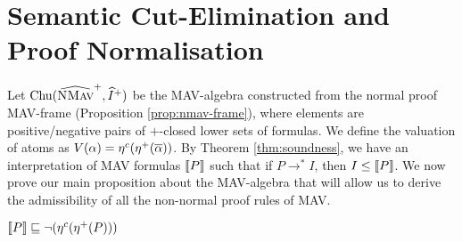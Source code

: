 \section{Semantic Cut-Elimination and Proof Normalisation}
\label{sec:mav-cut-elimination}

Let $\mathrm{Chu}(\widehat{\textsc{NMav}}^+, \mathop{\widehat{I}^+})$ be the MAV-algebra
constructed from the normal proof MAV-frame (Proposition
\ref{prop:nmav-frame}), where elements are positive/negative pairs of
$+$-closed lower sets of formulas. We define the valuation of atoms as
$V(\alpha) = \eta^c(\eta^+(\overline{\alpha}))$. By Theorem
\ref{thm:soundness}, we have an interpretation of MAV formulas
$\llbracket P \rrbracket$ such that if $P \longrightarrow^* I$, then $I \leq
\llbracket P \rrbracket$. We now prove our main proposition about the MAV-algebra
\NMAV{} that will allow us to derive the admissibility of all the
non-normal proof rules of MAV.

\begin{proposition}\label{prop:embedding-sem}
  $\llbracket P \rrbracket \sqsubseteq \lnot (\eta^c(\eta^+(P)))$
\end{proposition}

